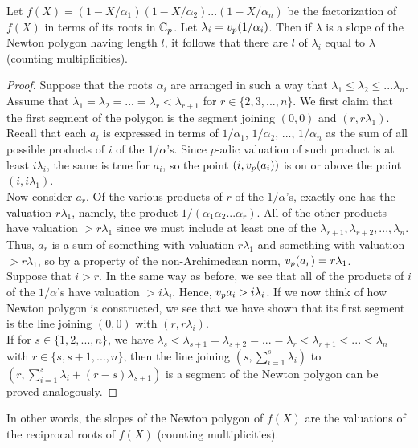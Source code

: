 \begin{theorem}
Let $f(X) = (1 - X/\alpha_1)(1 - X/\alpha_2)...(1 - X/\alpha_n)$ be the factorization of $f(X)$ in terms of its roots in $\mathbb{C}_p$. Let $\lambda_i = v_p{(1/\alpha_i)}$. Then if $\lambda$ is a slope of the Newton polygon having length $l$, it follows that there are $l$ of $\lambda_i$ equal to $\lambda$ (counting multiplicities). 
\begin{proof}
Suppose that the roots $\alpha_i$ are arranged in such a way that $\lambda_1 \leq \lambda_2 \leq ... \lambda_n$. Assume that $\lambda_1 = \lambda_2 = ... = \lambda_r < \lambda_{r + 1}$ for $r \in \{2,3,...,n\}$. We first claim that the first segment of the polygon is the segment joining $(0,0)$ and $(r, r\lambda_1)$. Recall that each $a_i$ is expressed in terms of $1/\alpha_1$, $1/\alpha_2$, ..., $1/\alpha_n$ as the sum of all possible products of $i$ of the $1/\alpha$'s. Since $p$-adic valuation of such product is at least $i\lambda_i$, the same is true for $a_i$, so the point $(i, v_p{(a_i)})$ is on or above the point $(i, i\lambda_1)$.\\
\indent Now consider $a_r$. Of the various products of $r$ of the $1/\alpha$'s, exactly one has the valuation $r\lambda_1$, namely, the product $1/(\alpha_1 \alpha_2 ... \alpha_r)$. All of the other products have valuation $> r\lambda_1$ since we must include at least one of the $\lambda_{r+1},\lambda_{r+2},...,\lambda_n$. Thus, $a_r$ is a sum of something with valuation $r\lambda_1$ and something with valuation $> r\lambda_1$, so by a property of the non-Archimedean norm, $v_p{(a_r)} = r\lambda_1$. \\
\indent Suppose that $i > r$. In the same way as before, we see that all of the products of $i$ of the $1/\alpha$'s have valuation $> i\lambda_i$. Hence, $v_p{a_i} > i\lambda_i$. If we now think of how Newton polygon is constructed, we see that we have shown that its first segment is the line joining $(0,0)$ with $(r, r\lambda_i)$.\\
\indent If for $s \in \{1,2,..., n\}$, we have $\lambda_s < \lambda_{s + 1} = \lambda_{s + 2} = ... = \lambda_{r} < \lambda_{r + 1} < ... < \lambda_{n}$ with $r \in \{s, s+1, ..., n \}$, then the line joining $(s, \sum_{i=1}^{s} \lambda_i)$ to $(r, \sum_{i=1}^{s} \lambda_i + (r - s)\lambda_{s+1})$ is a segment of the Newton polygon can be proved analogously. 
\end{proof}
\end{theorem}
In other words, the slopes of the Newton polygon of $f(X)$ are the valuations of the reciprocal roots of $f(X)$ (counting multiplicities). 


